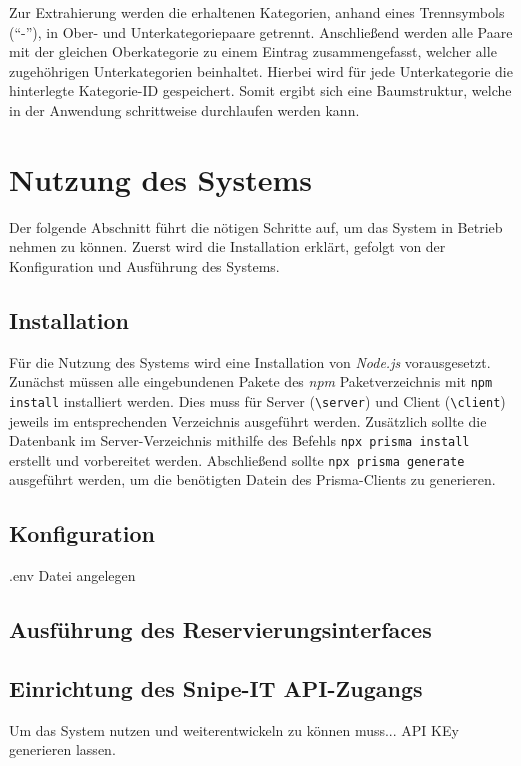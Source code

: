 Zur Extrahierung werden die erhaltenen Kategorien, anhand eines Trennsymbols (\enquote{-}), in Ober- und
Unterkategoriepaare getrennt. Anschließend werden alle Paare mit der gleichen Oberkategorie zu einem
Eintrag zusammengefasst, welcher alle zugehöhrigen Unterkategorien beinhaltet. Hierbei wird für jede
Unterkategorie die hinterlegte Kategorie-ID gespeichert. Somit ergibt sich eine Baumstruktur, welche
in der Anwendung schrittweise durchlaufen werden kann. 


\section{Nutzung des Systems}
Der folgende Abschnitt führt die nötigen Schritte auf, um das System in Betrieb nehmen zu können.
Zuerst wird die Installation erklärt, gefolgt von der Konfiguration und Ausführung des Systems.

\subsection{Installation}
Für die Nutzung des Systems wird eine Installation von \textit{Node.js} vorausgesetzt. Zunächst
müssen alle eingebundenen Pakete des \textit{npm} Paketverzeichnis mit \lstinline{npm install}
installiert werden. Dies muss für Server (\lstinline{\server}) und Client (\lstinline{\client})
jeweils im entsprechenden Verzeichnis ausgeführt werden. Zusätzlich sollte die Datenbank im
Server-Verzeichnis mithilfe des Befehls \lstinline{npx prisma install }
erstellt und vorbereitet werden. Abschließend sollte \lstinline{npx prisma generate} ausgeführt
werden, um die benötigten Datein des Prisma-Clients zu generieren. 



\subsection{Konfiguration}
.env Datei angelegen

\subsection{Ausführung des Reservierungsinterfaces}


\subsection{Einrichtung des Snipe-IT API-Zugangs}
Um das System nutzen und weiterentwickeln zu können muss... API KEy generieren lassen.

